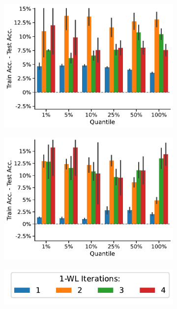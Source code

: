 \begin{figure}[htb]
	\hfill
	\begin{subfigure}[b]{0.3\textwidth}
		\centering
		\includegraphics[width=\textwidth]{Figures/train_test_diff_k_wl_PROTEINS.pdf}
		\vspace*{-4ex} 
		\caption{\proteins}
	\end{subfigure}
	\hfill
	\begin{subfigure}[b]{0.3\textwidth}
		\centering
		\includegraphics[width=\textwidth]{Figures/train_test_diff_k_wl_REDDIT-BINARY.pdf}
		\vspace*{-4ex} 
		\caption{\reddit}
	\end{subfigure}
	\begin{subfigure}[b]{0.3\textwidth}
		\centering
		\includegraphics[width=\textwidth]{Figures/train_test_diff_k_wl_legend.pdf}

\end{subfigure}
\end{figure}

